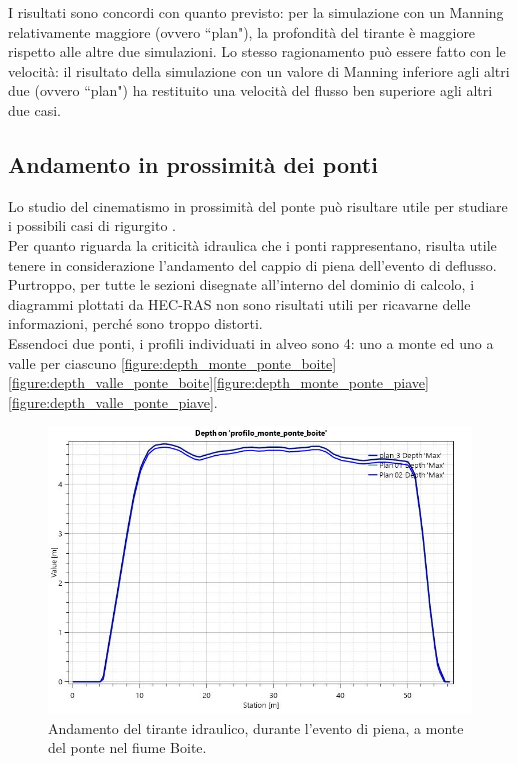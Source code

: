 I risultati sono concordi con quanto previsto: per la simulazione con un Manning relativamente maggiore (ovvero ``plan"), la profondità del tirante è maggiore rispetto alle altre due simulazioni. Lo stesso ragionamento può essere fatto con le velocità: il risultato della simulazione con un valore di Manning inferiore agli altri due (ovvero ``plan") ha restituito una velocità del flusso ben superiore agli altri due casi.

\subsection{Andamento in prossimità dei ponti}
Lo studio del cinematismo in prossimità del ponte può risultare utile per studiare i possibili casi di rigurgito \cite{rigurgito}.\\
Per quanto riguarda la criticità idraulica che i ponti rappresentano, risulta utile tenere in considerazione l'andamento del cappio di piena dell'evento di deflusso. Purtroppo, per tutte le sezioni disegnate all'interno del dominio di calcolo, i diagrammi plottati da HEC-RAS non sono risultati utili per ricavarne delle informazioni, perché sono troppo distorti.\\
Essendoci due ponti, i profili individuati in alveo sono 4: uno a monte ed uno a valle per ciascuno \eqref{figure:depth_monte_ponte_boite}\eqref{figure:depth_valle_ponte_boite}\eqref{figure:depth_monte_ponte_piave}\eqref{figure:depth_valle_ponte_piave}.

\begin{figure}[H] \centering
    \includegraphics[scale=0.5]{immagini/depth_monte_ponte_boite.JPG}
    \caption{Andamento del tirante idraulico, durante l'evento di piena, a monte del ponte nel fiume Boite.}
    \label{figure:depth_monte_ponte_boite}
\end{figure}

